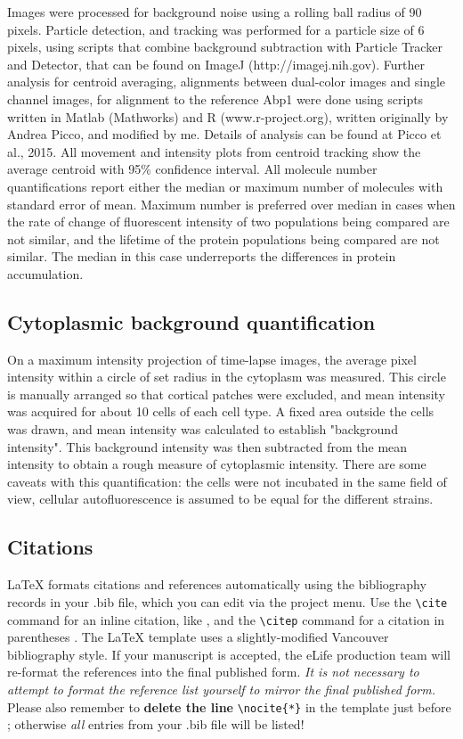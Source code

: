 \documentclass[9pt,lineno]{elife}
\begin{document}
Images were processed for background noise using a rolling ball radius of 90 pixels. Particle detection, and tracking was performed for a particle size of 6 pixels, using scripts that combine background subtraction with Particle Tracker and Detector, that can be found on ImageJ (http://imagej.nih.gov). Further analysis for centroid averaging, alignments between dual-color images and single channel images, for alignment to the reference Abp1 were done using scripts written in Matlab (Mathworks) and R (www.r-project.org), written originally by Andrea Picco, and modified by me. Details of analysis can be found at Picco et al., 2015. All movement and intensity plots from centroid tracking show the average centroid with 95\% confidence interval. All molecule number quantifications report either the median or maximum number of molecules with standard error of mean. Maximum number is preferred over median in cases when the rate of change of fluorescent intensity of two populations being compared are not similar, and the lifetime of the protein populations being compared are not similar. The median in this case underreports the differences in protein accumulation.

\subsection{Cytoplasmic background quantification}
On a maximum intensity projection of time-lapse images, the average pixel intensity within a circle of set radius in the cytoplasm was measured. This circle is manually arranged so that cortical patches were excluded, and mean intensity was acquired for about 10 cells of each cell type. A fixed area outside the cells was drawn, and mean intensity was calculated to establish "background intensity". This background intensity was then subtracted from the mean intensity to obtain a rough measure of cytoplasmic intensity. There are some caveats with this quantification: the cells were not incubated in the same field of view, cellular autofluorescence is assumed to be equal for the different strains.

\subsection{Citations}

LaTeX formats citations and references automatically using the bibliography records in your .bib file, which you can edit via the project menu. Use the \verb|\cite| command for an inline citation, like \cite{Aivazian917}, and the \verb|\citep| command for a citation in parentheses \citep{Aivazian917}. The LaTeX template uses a slightly-modified Vancouver bibliography style. If your manuscript is accepted, the eLife production team will re-format the references into the final published form. \emph{It is not necessary to attempt to format the reference list yourself to mirror the final published form.} Please also remember to \textbf{delete the line} \verb|\nocite{*}| in the template just before \verb||; otherwise \emph{all} entries from your .bib file will be listed! 
\end{document}
